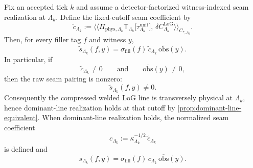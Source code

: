 \documentclass[11pt]{article}
\begin{document}
\begin{theorem}
\label{thm:seam-faithfulness-scalar}
Fix an accepted tick \(k\) and assume a detector-factorized witness-indexed seam realization at
\(\Lambda_k\).
Define the fixed-cutoff seam coefficient by
\begin{equation}
\widetilde c_{\Lambda_k}
:=
\big\langle\!\big\langle
\Pi_{\mathrm{phys},\Lambda_k}\mathsf T_{\Lambda_k}\!\big[\tau^{\mathrm{unit}}_{\Lambda_k}\big],\,
\delta C^{\mathrm{LoG}}_{\Lambda_k}
\big\rangle\!\big\rangle_{C_{\ast,\Lambda_k}}.
\label{eq:seam-faithfulness-coeff}
\end{equation}
Then, for every filler tag \(f\) and witness \(y\),
\begin{equation}
\widetilde s_{\Lambda_k}(f,y)
=
\sigma_{\mathrm{fill}}(f)\,
\widetilde c_{\Lambda_k}\,
\overline{\mathrm{obs}}(y).
\label{eq:raw-seam-factorization}
\end{equation}
In particular, if
\[
\widetilde c_{\Lambda_k}\neq 0
\qquad\text{and}\qquad
\overline{\mathrm{obs}}(y)\neq 0,
\]
then the raw seam pairing is nonzero:
\[
\widetilde s_{\Lambda_k}(f,y)\neq 0.
\]
Consequently the compressed welded LoG line is transversely physical at \(\Lambda_k\), hence
dominant-line realization holds at that cutoff by \cref{prop:dominant-line-equivalent}.
When dominant-line realization holds, the normalized seam coefficient
\begin{equation}
c_{\Lambda_k}
:=
\kappa_{\Lambda_k}^{-1/2}\,\widetilde c_{\Lambda_k}
\label{eq:normalized-seam-coeff}
\end{equation}
is defined and
\begin{equation}
s_{\Lambda_k}(f,y)
=
\sigma_{\mathrm{fill}}(f)\,
c_{\Lambda_k}\,
\overline{\mathrm{obs}}(y).
\label{eq:normalized-seam-factorization}
\end{equation}
\end{theorem}
\end{document}
